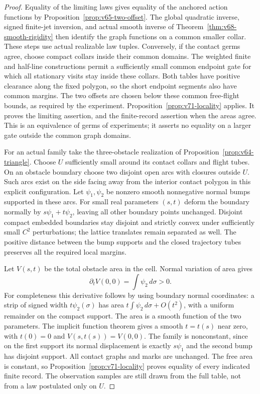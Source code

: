 \begin{proof}
Equality of the limiting laws gives equality of the anchored action
functions by Proposition~\ref{prop:v65-two-offset}.  The global
quadratic inverse, signed finite-jet inversion, and actual smooth
inverse of Theorem~\ref{thm:v68-smooth-rigidity} then identify the graph
functions on a common smaller collar.  These steps use actual realizable
law tuples.  Conversely, if the contact germs agree, choose compact
collars inside their common domains.  The weighted finite and half-line
constructions permit a sufficiently small common endpoint gate for which
all stationary visits stay inside these collars.  Both tables have
positive clearance along the fixed polygon, so the short endpoint
segments also have common margins.  The two offsets are chosen below
these common free-flight bounds, as required by the experiment.  Proposition~\ref{prop:v71-locality} applies.  It proves the
limiting assertion, and the finite-record assertion when the areas agree.
This is an equivalence of germs of experiments; it asserts no equality
on a larger gate outside the common graph domains.

For an actual family take the three-obstacle realization of
Proposition~\ref{prop:v64-triangle}.  Choose $U$ sufficiently small around
its contact collars and flight tubes.  On an obstacle boundary choose
two disjoint open arcs with closures outside $U$.  Such arcs exist on
the side facing away from the interior contact polygon in this explicit
configuration.  Let $\psi_1,\psi_2$ be nonzero smooth nonnegative normal
bumps supported in these arcs.  For small real parameters $(s,t)$ deform
the boundary normally by $s\psi_1+t\psi_2$, leaving all other boundary
points unchanged.  Disjoint compact embedded boundaries stay disjoint
and strictly convex under sufficiently small $C^2$ perturbations; the
lattice translates remain separated as well.  The positive distance
between the bump supports and the closed trajectory tubes preserves
all the required local margins.

Let $V(s,t)$ be the total obstacle area in the cell.  Normal variation of
area gives
\[
 \partial_t V(0,0)=\int\psi_2\,d\sigma>0.
\]
For completeness this derivative follows by using boundary normal
coordinates: a strip of signed width $t\psi_2(\sigma)$ has area
$t\int\psi_2\,d\sigma+O(t^2)$, with a uniform remainder on the compact
support.  The area is a smooth function of the two parameters.  The
implicit function theorem gives a smooth $t=t(s)$ near zero, with
$t(0)=0$ and $V(s,t(s))=V(0,0)$.  The family is nonconstant, since on
the first support its normal displacement is exactly $s\psi_1$ and
the second bump has disjoint support.  All contact graphs and marks are
unchanged.  The free area is constant, so
Proposition~\ref{prop:v71-locality} proves equality of every indicated
finite record.  The observation samples are still drawn from the full
table, not from a law postulated only on $U$.


\end{proof}
